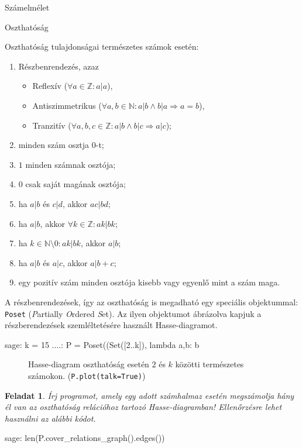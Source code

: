 \documentclass{amsbook}
\theoremstyle{mystyle}
\newtheorem{exercise}{Feladat}[part]
\begin{document}
\begin{part}{Számelmélet}
\begin{section}{Oszthatóság}
  
  Oszthatóság tulajdonságai természetes számok esetén:
  \begin{enumerate}
    \item Részbenrendezés, azaz
      \begin{itemize}
        \item Reflexív ($\forall a\in\mathbb{Z}: a|a$),
        \item Antiszimmetrikus 
          ($\forall a,b\in\mathbb{N}: a|b\wedge b|a\Rightarrow a=b$),
        \item Tranzitív 
          ($\forall a,b,c\in\mathbb{Z}: a|b \wedge b|c \Rightarrow a|c$);
      \end{itemize}
    \item minden szám osztja $0$-t;
    \item $1$ minden számnak osztója;
    \item $0$ csak saját magának osztója;
    \item ha $a|b$ és $c|d$, akkor $ac|bd$;
    \item ha $a|b$, akkor $\forall k\in \mathbb{Z}: ak|bk$;
    \item ha $k\in \mathbb{N}\setminus{0}:ak|bk$, akkor $a|b$;
    \item ha $a|b$ és $a|c$, akkor $a|b+c$;
    \item egy pozitív szám minden osztója kisebb vagy egyenlő mint a szám maga.
  \end{enumerate}

  A részbenrendezések, így az oszthatóság is megadható egy speciális objektummal:
  \texttt{Poset} (\emph{P}artially \emph{O}rdered \emph{S}et).
  Az ilyen objektumot ábrázolva kapjuk a részberendezések szemléltetésére
  használt Hasse-diagramot.
  \begin{sageexample}
    sage: k = 15
    ....: P = Poset((Set([2..k]), lambda a,b: b %
  \end{sageexample}
  \begin{figure}[h!]
    \centering
    \caption{Hasse-diagram oszthatóság esetén $2$ és $k$ közötti természetes
    számokon.  (\texttt{P.plot(talk=True)})}
  \end{figure}

  \begin{exercise} Írj programot, amely egy adott számhalmaz esetén megszámolja hány
    él van az oszthatóság relációhoz tartozó  Hasse-diagramban! Ellen\H orzésre lehet 
    használni az alábbi kódot.
  \end{exercise}
  \begin{sageexample}
    sage: len(P.cover_relations_graph().edges())
  \end{sageexample}


\end{section}
\end{part}
\end{document}
